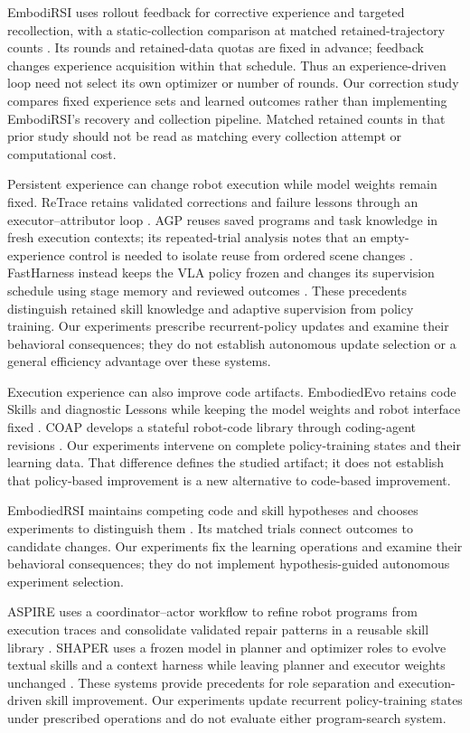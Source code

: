 \documentclass[10pt,letterpaper]{article}
\begin{document}
EmbodiRSI uses rollout feedback for corrective experience and targeted
recollection, with a static-collection comparison at matched
retained-trajectory counts \cite{lang2026embodirsi}. Its rounds and
retained-data quotas are fixed in advance; feedback changes experience
acquisition within that schedule. Thus an experience-driven loop need
not select its own optimizer or number of rounds. Our correction study
compares fixed experience sets and learned outcomes rather than
implementing EmbodiRSI's recovery and collection pipeline. Matched
retained counts in that prior study should not be read as matching every
collection attempt or computational cost.

Persistent experience can change robot execution while model weights
remain fixed. ReTrace retains validated corrections and failure lessons
through an executor--attributor loop \cite{yu2026retrace}. AGP reuses
saved programs and task knowledge in fresh execution contexts; its
repeated-trial analysis notes that an empty-experience control is needed
to isolate reuse from ordered scene changes
\cite{jia2026agentaspolicy}. FastHarness instead keeps the VLA policy
frozen and changes its supervision schedule using stage memory and
reviewed outcomes \cite{lin2026fastharness}. These precedents
distinguish retained skill knowledge and adaptive supervision from
policy training. Our experiments prescribe recurrent-policy updates and
examine their behavioral consequences; they do not establish autonomous
update selection or a general efficiency advantage over these systems.

Execution experience can also improve code artifacts. EmbodiedEvo
retains code Skills and diagnostic Lessons while keeping the model
weights and robot interface fixed
\cite{li2026embodiedevoselfimprovingcodingagents}. COAP develops a
stateful robot-code library through coding-agent revisions
\cite{hu2026embodied}. Our experiments intervene on complete
policy-training states and their learning data. That difference defines
the studied artifact; it does not establish that policy-based
improvement is a new alternative to code-based improvement.

EmbodiedRSI maintains competing code and skill hypotheses and chooses
experiments to distinguish them \cite{song2026embodiedrsi}. Its matched
trials connect outcomes to candidate changes. Our experiments fix the
learning operations and examine their behavioral consequences; they do
not implement hypothesis-guided autonomous experiment selection.

ASPIRE uses a coordinator--actor workflow to refine robot programs from
execution traces and consolidate validated repair patterns in a reusable
skill library \cite{lu2026aspire}. SHAPER uses a frozen model in
planner and optimizer roles to evolve textual skills and a context
harness while leaving planner and executor weights unchanged
\cite{wang2026shaper}. These systems provide precedents for role
separation and execution-driven skill improvement. Our experiments
update recurrent policy-training states under prescribed operations and
do not evaluate either program-search system.
\end{document}
